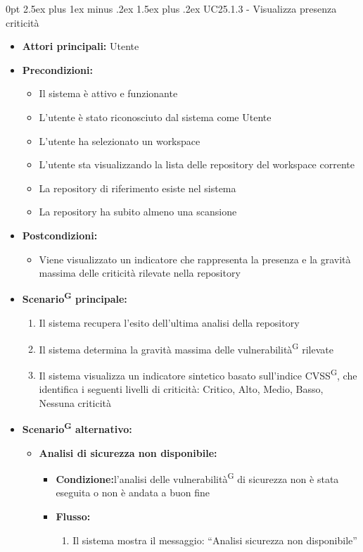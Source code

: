\documentclass[a4paper, 11pt]{article}
\makeatletter
\renewcommand\paragraph{\@startsection{paragraph}{4}
  {0pt}
  {2.5ex plus 1ex minus .2ex}
  {1.5ex plus .2ex}
  {\normalfont\normalsize\bfseries\color{AccentDark}}}
\makeatother
\begin{document}
\paragraph{UC25.1.3 - Visualizza presenza criticità} \label{UC25.1.3}
\begin{itemize}
	\item \textbf{Attori principali:} Utente
	\item \textbf{Precondizioni:} 
	\begin{itemize}
		\item Il sistema è attivo e funzionante
		\item L'utente è stato riconosciuto dal sistema come Utente
		\item L'utente ha selezionato un workspace 
		\item L'utente sta visualizzando la lista delle repository del workspace corrente
		\item La repository di riferimento esiste nel sistema
		\item La repository ha subito almeno una scansione
	\end{itemize}
	\item \textbf{Postcondizioni:} 
	\begin{itemize}
		\item Viene visualizzato un indicatore che rappresenta la presenza e la gravità massima delle criticità rilevate nella repository
	\end{itemize}
	\item \textbf{Scenario\textsuperscript{G} principale:}
	\begin{enumerate}
		\item Il sistema recupera l'esito dell'ultima analisi della repository
		\item Il sistema determina la gravità massima delle vulnerabilità\textsuperscript{G} rilevate
		\item Il sistema visualizza un indicatore sintetico basato sull'indice CVSS\textsuperscript{G}, che identifica i seguenti livelli di criticità: Critico, Alto, Medio, Basso, Nessuna criticità
	\end{enumerate}
		\item \textbf{Scenario\textsuperscript{G} alternativo:}
	\begin{itemize}
		\item \textbf{Analisi di sicurezza non disponibile:} 
			\begin{itemize}
				\item \textbf{Condizione:}l'analisi delle vulnerabilità\textsuperscript{G} di sicurezza non è stata eseguita o non è andata a buon fine
				\item \textbf{Flusso:} 
				\begin{enumerate}
					\item Il sistema mostra il messaggio: “Analisi sicurezza non disponibile”
				\end{enumerate}
			\end{itemize}
	\end{itemize}
\end{itemize}
\end{document}

